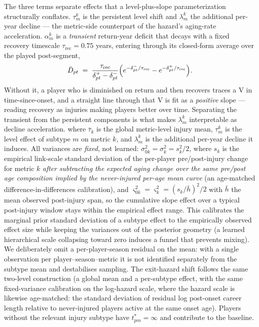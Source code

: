 The three terms separate effects that a level-plus-slope parameterization structurally conflates.
$\tau^k_m$ is the persistent level shift and $\lambda^k_m$ the additional per-year decline --- the
metric-side counterpart of the hazard's aging-rate acceleration.  $\alpha^k_m$ is a \emph{transient}
return-year deficit that decays with a fixed recovery timescale $\tau_{\mathrm{rec}} = 0.75$ years,
entering through its closed-form average over the played post-segment,
\[
  \bar{D}_{pt} \;=\; \frac{\tau_{\mathrm{rec}}}{\delta^{+}_{pt}-\delta^{-}_{pt}}
  \Bigl(e^{-\delta^{-}_{pt}/\tau_{\mathrm{rec}}} - e^{-\delta^{+}_{pt}/\tau_{\mathrm{rec}}}\Bigr).
\]
Without it, a player who is diminished on return and then recovers traces a V in time-since-onset,
and a straight line through that V is fit as a \emph{positive} slope --- reading recovery as
injuries making players better over time.  Separating the transient from the persistent components
is what makes $\lambda^k_m$ interpretable as decline acceleration.
where $\bar{\tau}_k$ is the global metric-level injury mean, $\tau^k_m$ is the level effect of subtype $m$ on metric $k$, and $\lambda^k_m$ is the additional per-year decline it induces.  All variances are \emph{fixed}, not learned: $\sigma^2_{0k} = \sigma^2_k = s_k^2/2$, where $s_k$ is the empirical link-scale standard deviation of the per-player pre/post-injury change for metric $k$ \emph{after subtracting the expected aging change over the same pre/post age composition implied by the never-injured per-age mean curve} (an age-matched difference-in-differences calibration), and $\varsigma^2_{0k} = \varsigma^2_k = (s_k/\bar{h})^2/2$ with $\bar{h}$ the mean observed post-injury span, so the cumulative slope effect over a typical post-injury window stays within the empirical effect range.  This calibrates the marginal prior standard deviation of a subtype effect to the empirically observed effect size while keeping the variances out of the posterior geometry (a learned hierarchical scale collapsing toward zero induces a funnel that prevents mixing).  We deliberately omit a per-player-season residual on the mean: with a single observation per player--season--metric it is not identified separately from the subtype mean and destabilises sampling.  The exit-hazard shift follows the same two-level construction (a global mean and a per-subtype effect, with the same fixed-variance calibration on the log-hazard scale, where the hazard scale is likewise age-matched: the standard deviation of residual log post-onset career length relative to never-injured players active at the same onset age).  Players without the relevant injury subtype have $t^{*}_{pm} = \infty$ and contribute to the baseline.

